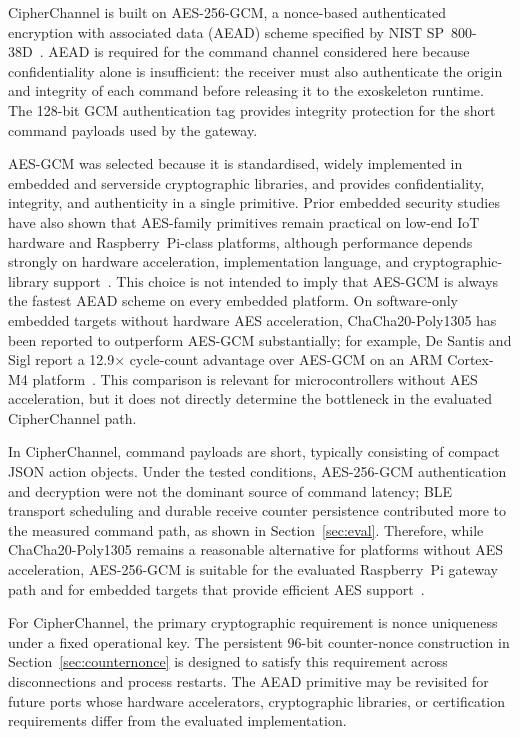 \documentclass[journal]{IEEEtran}
\begin{document}
CipherChannel is built on AES-256-GCM, a nonce-based authenticated encryption with associated data (AEAD) scheme specified by NIST SP~800-38D~\cite{nist_sp800_38d}. AEAD is required for the command channel considered here because confidentiality alone is insufficient: the receiver must also authenticate the origin and integrity of each command before releasing it to the exoskeleton runtime. The 128-bit GCM authentication tag provides integrity protection for the short command payloads used by the gateway.

AES-GCM was selected because it is standardised, widely implemented in embedded and serverside cryptographic libraries, and provides confidentiality, integrity, and authenticity in a single primitive. Prior embedded security studies have also shown that AES-family primitives remain practical on low-end IoT hardware and Raspberry~Pi-class platforms, although performance depends strongly on hardware acceleration, implementation language, and cryptographic-library support~\cite{kietzmann2021hw,riddle2023aespie}. This choice is not intended to imply that AES-GCM is always the fastest AEAD scheme on every embedded platform. On software-only embedded targets without hardware AES acceleration, ChaCha20-Poly1305 has been reported to outperform AES-GCM substantially; for example, De Santis and Sigl report a 12.9$\times$ cycle-count advantage over AES-GCM on an ARM Cortex-M4 platform~\cite{desantis2017chacha20}. This comparison is relevant for microcontrollers without AES acceleration, but it does not directly determine the bottleneck in the evaluated CipherChannel path.

In CipherChannel, command payloads are short, typically consisting of compact JSON action objects. Under the tested conditions, AES-256-GCM authentication and decryption were not the dominant source of command latency; BLE transport scheduling and durable receive counter persistence contributed more to the measured command path, as shown in Section~\ref{sec:eval}. Therefore, while ChaCha20-Poly1305 remains a reasonable alternative for platforms without AES acceleration, AES-256-GCM is suitable for the evaluated Raspberry~Pi gateway path and for embedded targets that provide efficient AES support~\cite{desantis2017chacha20}.

For CipherChannel, the primary cryptographic requirement is nonce uniqueness under a fixed operational key. The persistent 96-bit counter-nonce construction in Section~\ref{sec:counternonce} is designed to satisfy this requirement across disconnections and process restarts. The AEAD primitive may be revisited for future ports whose hardware accelerators, cryptographic libraries, or certification requirements differ from the evaluated implementation.
\end{document}
